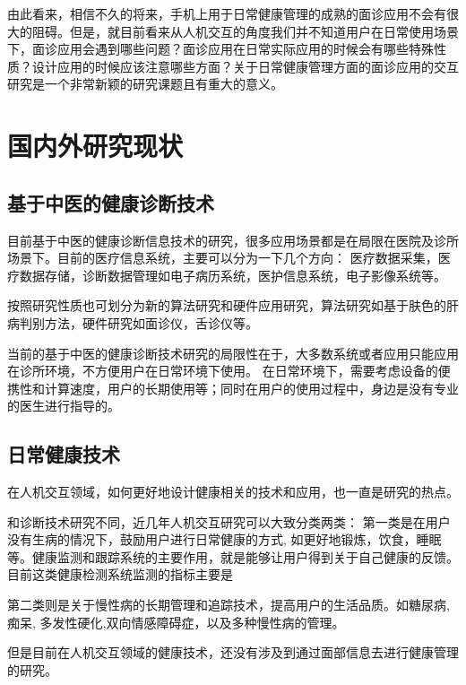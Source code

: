 由此看来，相信不久的将来，手机上用于日常健康管理的成熟的面诊应用不会有很大的阻碍。但是，就目前看来从人机交互的角度我们并不知道用户在日常使用场景下，面诊应用会遇到哪些问题？面诊应用在日常实际应用的时候会有哪些特殊性质？设计应用的时候应该注意哪些方面？关于日常健康管理方面的面诊应用的交互研究是一个非常新颖的研究课题且有重大的意义。

\section{国内外研究现状}

\subsection{基于中医的健康诊断技术}

目前基于中医的健康诊断信息技术的研究，很多应用场景都是在局限在医院及诊所场景下。目前的医疗信息系统，主要可以分为一下几个方向：
医疗数据采集，医疗数据存储，诊断数据管理如电子病历系统，医护信息系统，电子影像系统等。

按照研究性质也可划分为新的算法研究和硬件应用研究，算法研究如基于肤色的肝病判别方法，硬件研究如面诊仪，舌诊仪等。

当前的基于中医的健康诊断技术研究的局限性在于，大多数系统或者应用只能应用在诊所环境，不方便用户在日常环境下使用。
在日常环境下，需要考虑设备的便携性和计算速度，用户的长期使用等；同时在用户的使用过程中，身边是没有专业的医生进行指导的。

\subsection{日常健康技术}

在人机交互领域，如何更好地设计健康相关的技术和应用，也一直是研究的热点。

和诊断技术研究不同，近几年人机交互研究可以大致分类两类： 第一类是在用户没有生病的情况下，鼓励用户进行日常健康的方式, 如更好地锻炼，饮食，睡眠等。健康监测和跟踪系统的主要作用，就是能够让用户得到关于自己健康的反馈。目前这类健康检测系统监测的指标主要是

第二类则是关于慢性病的长期管理和追踪技术，提高用户的生活品质。如糖尿病\cite{mamykina2008mahi:}, 痴呆\cite{yasuda2009remote}, 多发性硬化\cite{ayobi2017quantifying},双向情感障碍症\cite{bardram2013designing}，以及多种慢性病的管理\cite{nunes2015self-care}。

但是目前在人机交互领域的健康技术，还没有涉及到通过面部信息去进行健康管理的研究。


